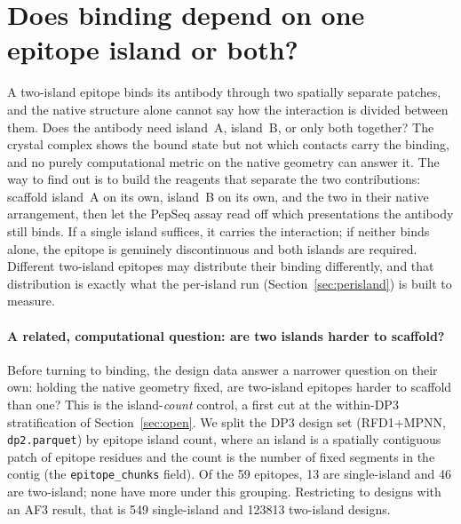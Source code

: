 \section{Does binding depend on one epitope island or both?}\label{sec:islands}
A two-island epitope binds its antibody through two spatially separate patches, and the native
structure alone cannot say how the interaction is divided between them. Does the antibody need
island~A, island~B, or only both together? The crystal complex shows the bound state but not
which contacts carry the binding, and no purely computational metric on the native geometry can
answer it. The way to find out is to build the reagents that separate the two contributions:
scaffold island~A on its own, island~B on its own, and the two in their native arrangement, then
let the PepSeq assay read off which presentations the antibody still binds. If a single island
suffices, it carries the interaction; if neither binds alone, the epitope is genuinely
discontinuous and both islands are required. Different two-island epitopes may distribute their
binding differently, and that distribution is exactly what the per-island run
(Section~\ref{sec:perisland}) is built to measure.

\paragraph{A related, computational question: are two islands harder to scaffold?}
Before turning to binding, the design data answer a narrower question on their own: holding the
native geometry fixed, are two-island epitopes harder to scaffold than one? This is the
island-\emph{count} control, a first cut at the within-DP3 stratification of
Section~\ref{sec:open}. We split the DP3 design set (RFD1+MPNN, \texttt{dp2.parquet}) by
epitope island count, where an island is a spatially contiguous patch of epitope residues and
the count is the number of fixed segments in the contig (the \texttt{epitope\_chunks} field).
Of the 59 epitopes, 13 are single-island and 46 are two-island; none have more under this
grouping. Restricting to designs with an AF3 result, that is 549 single-island and
\num{123813} two-island designs.

